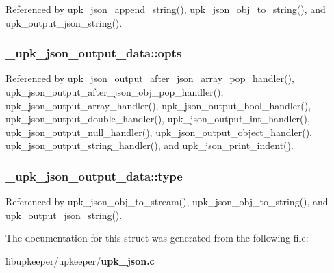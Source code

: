 Referenced by upk\_\-json\_\-append\_\-string(), upk\_\-json\_\-obj\_\-to\_\-string(), and upk\_\-output\_\-json\_\-string().

\subsubsection[{opts}]{ {\bf \_\-upk\_\-json\_\-output\_\-data::opts}}\label{struct__upk__json__output__data_a8edd62bfcca41962e39242d1bd43b683}


Referenced by upk\_\-json\_\-output\_\-after\_\-json\_\-array\_\-pop\_\-handler(), upk\_\-json\_\-output\_\-after\_\-json\_\-obj\_\-pop\_\-handler(), upk\_\-json\_\-output\_\-array\_\-handler(), upk\_\-json\_\-output\_\-bool\_\-handler(), upk\_\-json\_\-output\_\-double\_\-handler(), upk\_\-json\_\-output\_\-int\_\-handler(), upk\_\-json\_\-output\_\-null\_\-handler(), upk\_\-json\_\-output\_\-object\_\-handler(), upk\_\-json\_\-output\_\-string\_\-handler(), and upk\_\-json\_\-print\_\-indent().

\subsubsection[{type}]{ {\bf \_\-upk\_\-json\_\-output\_\-data::type}}\label{struct__upk__json__output__data_a20d2a665db9bf55ced0aa8b12e5af22f}


Referenced by upk\_\-json\_\-obj\_\-to\_\-stream(), upk\_\-json\_\-obj\_\-to\_\-string(), and upk\_\-output\_\-json\_\-string().



The documentation for this struct was generated from the following file:\begin{DoxyCompactItemize}
\item 
libupkeeper/upkeeper/{\bf upk\_\-json.c}\end{DoxyCompactItemize}

